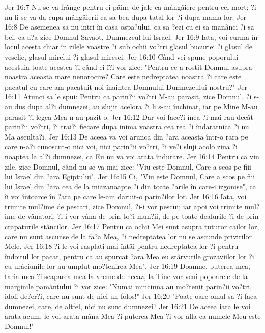Jer 16:7  Nu se va frânge pentru ei pâine de jale ca mângâiere pentru cel mort; ?i nu li se va da cupa mângâierii ca sa bea dupa tatal lor ?i dupa mama lor.
Jer 16:8  De asemenea sa nu intri în casa ospa?ului, ca sa ?ezi cu ei sa manânci ?i sa bei, ca a?a zice Domnul Savaot, Dumnezeul lui Israel:
Jer 16:9  Iata, voi curma în locul acesta chiar în zilele voastre ?i sub ochii vo?tri glasul bucuriei ?i glasul de veselie, glasul mirelui ?i glasul miresei.
Jer 16:10  Când vei spune poporului acestuia toate acestea ?i când ei î?i vor zice: "Pentru ce a rostit Domnul asupra noastra aceasta mare nenorocire? Care este nedreptatea noastra ?i care este pacatul cu care am pacatuit noi înaintea Domnului Dumnezeului nostru?"
Jer 16:11  Atunci sa le spui: Pentru ca parin?ii vo?tri M-au parasit, zice Domnul, ?i s-au dus dupa al?i dumnezei, au slujit acelora ?i li s-au închinat, iar pe Mine M-au parasit ?i legea Mea n-au pazit-o.
Jer 16:12  Dar voi face?i înca ?i mai rau decât parin?ii vo?tri, ?i trai?i fiecare dupa inima voastra cea rea ?i îndaratnica ?i nu Ma asculta?i.
Jer 16:13  De aceea va voi arunca din ?ara aceasta într-o rara pe care n-a?i cunoscut-o nici voi, nici parin?ii vo?tri, ?i ve?i sluji acolo ziua ?i noaptea la al?i dumnezei, ca Eu nu va voi arata îndurare.
Jer 16:14  Pentru ca vin zile, zice Domnul, când nu se va mai zice: "Viu este Domnul, Care a scos pe fiii lui Israel din ?ara Egiptului",
Jer 16:15  Ci, "Viu este Domnul, Care a scos pe fiii lui Israel din ?ara cea de la miazanoapte ?i din toate ?arile în care-i izgonise", ca îi voi întoarce în ?ara pe care le-am daruit-o parin?ilor lor.
Jer 16:16  Iata, voi trimite mul?ime de pescari, zice Domnul, ?i-i vor pescui; iar apoi voi trimite mul?ime de vânatori, ?i-i vor vâna de prin to?i mun?ii, de pe toate dealurile ?i de prin crapaturile stâncilor.
Jer 16:17  Pentru ca ochii Mei sunt asupra tuturor cailor lor, care nu sunt ascunse de la fa?a Mea, ?i nedreptatea lor nu se ascunde privirilor Mele.
Jer 16:18  ?i le voi rasplati mai întâi pentru nedreptatea lor ?i pentru îndoitul lor pacat, pentru ca au spurcat ?ara Mea eu stârvurile grozaviilor lor ?i cu urâciunile lor au umplut mo?tenirea Mea".
Jer 16:19  Doamne, puterea mea, taria mea ?i scaparea mea la vreme de necaz, la Tine vor veni popoarele de la marginile pamântului ?i vor zice: "Numai minciuna au mo?tenit parin?ii vo?tri, idoli de?er?i, care nu sunt de nici un folos!"
Jer 16:20  "Poate oare omul sa-?i faca dumnezei, care, de altfel, nici nu sunt dumnezei?
Jer 16:21  De aceea iata le voi arata acum, le voi arata mâna Mea ?i puterea Mea ?i vor afla ca numele Meu este Domnul!"
